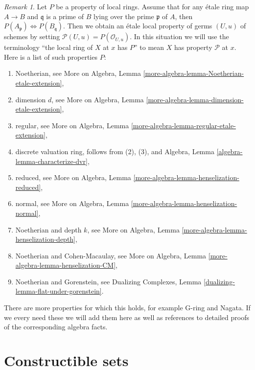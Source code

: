 \documentclass{stacks-project}
\theoremstyle{plain}
\theoremstyle{definition}
\theoremstyle{remark}
\newtheorem{remark}[subsection]{Remark}
\numberwithin{equation}{subsection}
\begin{document}
\begin{remark}
\label{remark-list-properties-local-ring-local-etale-topology}
Let $P$ be a property of local rings. Assume that for any
\'etale ring map $A \to B$ and $\mathfrak q$ is a prime of $B$ lying over
the prime $\mathfrak p$ of $A$, then
$P(A_\mathfrak p) \Leftrightarrow P(B_\mathfrak q)$.
Then we obtain an \'etale local property of germs $(U, u)$ of schemes
by setting $\mathcal{P}(U, u) = P(\mathcal{O}_{U, u})$.
In this situation we will use the terminology
``the local ring of $X$ at $x$ has $P$'' to mean
$X$ has property $\mathcal{P}$ at $x$.
Here is a list of such properties $P$:
\begin{enumerate}
\item Noetherian, see
More on Algebra, Lemma \ref{more-algebra-lemma-Noetherian-etale-extension},
\item dimension $d$, see
More on Algebra, Lemma \ref{more-algebra-lemma-dimension-etale-extension},
\item regular, see
More on Algebra, Lemma \ref{more-algebra-lemma-regular-etale-extension},
\item discrete valuation ring, follows from (2), (3), and
Algebra, Lemma \ref{algebra-lemma-characterize-dvr},
\item reduced, see
More on Algebra, Lemma \ref{more-algebra-lemma-henselization-reduced},
\item normal, see
More on Algebra, Lemma \ref{more-algebra-lemma-henselization-normal},
\item Noetherian and depth $k$, see
More on Algebra, Lemma \ref{more-algebra-lemma-henselization-depth},
\item Noetherian and Cohen-Macaulay, see
More on Algebra, Lemma \ref{more-algebra-lemma-henselization-CM},
\item Noetherian and Gorenstein, see
Dualizing Complexes, Lemma \ref{dualizing-lemma-flat-under-gorenstein}.
\end{enumerate}
There are more properties for which this holds, for example G-ring and
Nagata. If we every need these we will add them here
as well as references to detailed proofs of the corresponding
algebra facts.
\end{remark}







\section{Constructible sets}
\label{section-constructible}
\end{document}
